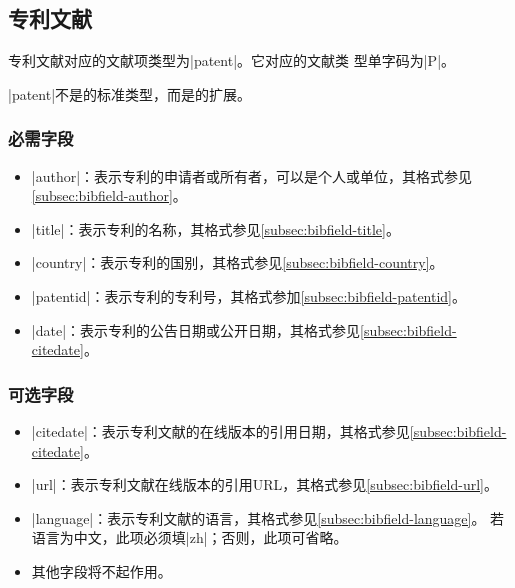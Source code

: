 

\subsection{专利文献}\label{subsec:bibtype-patent}

专利文献对应的{\BibTeX}文献项类型为|patent|。它对应的文献类
型单字码为|P|\cite{gbt3469-1983}。

|patent|不是{\BibTeX}的标准类型，而是{\njuthesis}的扩展。

\subsubsection{必需字段}

\begin{itemize}
\item |author|：表示专利的申请者或所有者，可以是个人或单位，其格式参见
  \ref{subsec:bibfield-author}。
\item |title|：表示专利的名称，其格式参见\ref{subsec:bibfield-title}。
\item |country|：表示专利的国别，其格式参见\ref{subsec:bibfield-country}。
\item |patentid|：表示专利的专利号，其格式参加\ref{subsec:bibfield-patentid}。
\item |date|：表示专利的公告日期或公开日期，其格式参见\ref{subsec:bibfield-citedate}。
\end{itemize}

\subsubsection{可选字段}

\begin{itemize}
\item |citedate|：表示专利文献的在线版本的引用日期，其格式参见\ref{subsec:bibfield-citedate}。
\item |url|：表示专利文献在线版本的引用URL，其格式参见\ref{subsec:bibfield-url}。
\item |language|：表示专利文献的语言，其格式参见\ref{subsec:bibfield-language}。
  若语言为中文，此项必须填|zh|；否则，此项可省略。
\item 其他字段将不起作用。
\end{itemize}

